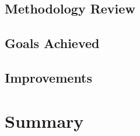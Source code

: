 \documentclass[11pt,a4paper]{report}
\begin{document}
\section{Methodology Review}
\label{sec:methodology-review}
\section{Goals Achieved}
\label{sec:goals-achieved}
\section{Improvements}
\label{sec:improvements}

\chapter*{Summary}
\label{sec:summary}

\newpage



\appendix
\end{document}
